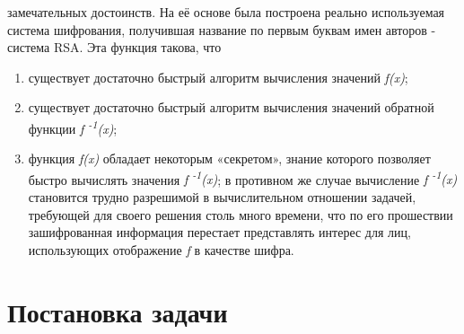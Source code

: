 замечательных достоинств. На её основе была построена реально используемая система шифрования, получившая название по первым буквам имен авторов - 
система RSA. Эта функция такова, что
\begin{enumerate}
    \item существует достаточно быстрый алгоритм вычисления значений \textit{f(x)};
    \item существует достаточно быстрый алгоритм вычисления значений обратной функции \textit{f\textsuperscript{ -1}(x)};
    \item функция \textit{f(x)} обладает некоторым «секретом», знание которого позволяет быстро вычислять значения \textit{f\textsuperscript{ -1}(x)};
в противном же случае вычисление \textit{f\textsuperscript{ -1}(x)} становится трудно разрешимой в вычислительном отношении задачей, требующей для 
своего решения столь много времени, что по его прошествии зашифрованная информация перестает представлять интерес для лиц, 
использующих отображение \textit{f} в качестве шифра.
\end{enumerate}	
\begin{comment}
  Еще до выхода из печати статьи копия доклада в Массачусетском Технологическом институте, посвящённого системе RSA. была послана известному 
популяризатору математики М. Гарднеру, который в 1977 г. в журнале Scientific American опубликовал статью посвящённую этой системе шифрования. 
В русском переводе заглавие статьи Гарднера звучит так: Новый вид шифра, на расшифровку которого потребуются миллионы лет. Именно эта статья сыграла 
важнейшую роль в распространении информации об RSA, привлекла к криптографии внимание широких кругов неспециалистов и фактически способствовала 
бурному прогрессу этой области, произошедшему в последовавшие 20 лет.
\end{comment}
\section{Постановка задачи}